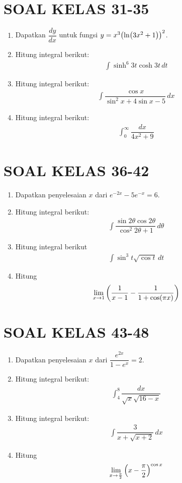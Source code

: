 \documentclass{article}
\begin{document}
\section*{SOAL KELAS 31-35}
\begin{enumerate}
	\item Dapatkan $\dfrac{dy}{dx}$ untuk fungsi $y=x^3\qty(\ln(3x^2+1))^2$.
	\item Hitung integral berikut:
	\begin{align*}
	\int\sinh^6 3t\cosh 3t \,dt
	\end{align*}
	\item Hitung integral berikut:
	\begin{align*}
	\int\dfrac{\cos x}{\sin^2 x+4\sin x-5}\, dx
	\end{align*}
	\item Hitung integral berikut:
	\begin{align*}
	\int_0^{\infty} \dfrac{dx}{4x^2+9}
	\end{align*}
\end{enumerate}
\newpage
\section*{SOAL KELAS 36-42}
\begin{enumerate}
	\item Dapatkan penyelesaian $x$ dari $e^{-2x}-5e^{-x}=6$.
	\item Hitung integral berikut:
	\begin{align*}
	\int \dfrac{\sin 2\theta\cos 2\theta}{\cos^2 2\theta+1}\, d\theta
	\end{align*}
	\item Hitung integral berikut 
	\begin{align*}
	\int \sin^3 t\sqrt{\cos t}\, dt
	\end{align*}
	\item Hitung 
	\begin{align*}
	\lim_{x\rightarrow 1} \qty(\dfrac{1}{x-1}-\dfrac{1}{1+\cos(\pi x)})
	\end{align*}
\end{enumerate}
\newpage
\section*{SOAL KELAS 43-48}
\begin{enumerate}
	\item Dapatkan penyelesaian $x$ dari $\dfrac{e^{2x}}{1-e^x}=2$.
	\item Hitung integral berikut:
	\begin{align*}
	\int_4^8 \dfrac{dx}{\sqrt{x}\sqrt{16-x}}
	\end{align*}
	\item Hitung integral berikut:
	\begin{align*}
	\int \dfrac{3}{x+\sqrt{x+2}}\, dx
	\end{align*}
	\item Hitung 
	\begin{align*}
	\lim_{x\rightarrow\frac{\pi}{2}}\qty(x-\frac{\pi}{2})^{\cos x}
	\end{align*}
\end{enumerate}
\end{document}
